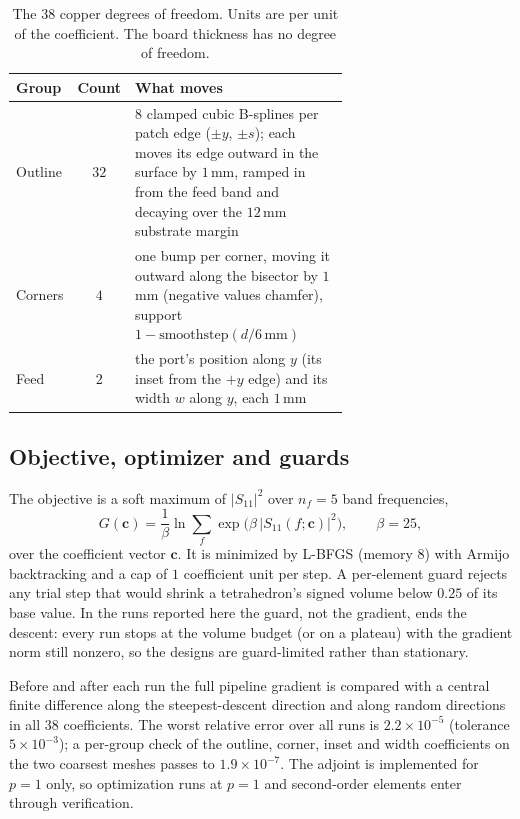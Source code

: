 \documentclass{anvil-paper}
\begin{document}
\begin{table}[t]
  \centering
  \caption{The $38$ copper degrees of freedom. Units are per unit of the
  coefficient. The board thickness has no degree of freedom.}
  \label{tab:dofs}
  \small
  \begin{tabular}{@{}l c >{\raggedright\arraybackslash}p{0.66\linewidth}@{}}
    \toprule
    Group & Count & What moves \\
    \midrule
    Outline & $32$ & $8$ clamped cubic B-splines per patch edge ($\pm y$, $\pm s$); each moves its edge outward in the surface by $1$\,mm, ramped in from the feed band and decaying over the $12$\,mm substrate margin \\
    Corners & $4$ & one bump per corner, moving it outward along the bisector by $1$\,mm (negative values chamfer), support $1 - \mathrm{smoothstep}(d/6\,\mathrm{mm})$ \\
    Feed & $2$ & the port's position along $y$ (its inset from the $+y$ edge) and its width $w$ along $y$, each $1$\,mm \\
    \bottomrule
  \end{tabular}
\end{table}

\subsection{Objective, optimizer and guards}
\label{sec:objective}

The objective is a soft maximum of $|S_{11}|^2$ over $n_f = 5$ band
frequencies,
\begin{equation}
  G(\mathbf{c}) = \frac{1}{\beta}\ln \sum_{f} \exp\!\big(\beta\,|S_{11}(f;\mathbf{c})|^2\big),
  \qquad \beta = 25,
  \label{eq:objective}
\end{equation}
over the coefficient vector $\mathbf{c}$. It is minimized by L-BFGS
(memory $8$) with Armijo backtracking and a cap of $1$ coefficient unit
per step. A per-element guard rejects any trial step that would shrink a
tetrahedron's signed volume below $0.25$ of its base value. In the runs
reported here the guard, not the gradient, ends the descent: every run
stops at the volume budget (or on a plateau) with the gradient norm still
nonzero, so the designs are guard-limited rather than stationary.

Before and after each run the full pipeline gradient is compared with a
central finite difference along the steepest-descent direction and along
random directions in all $38$ coefficients. The worst relative error over
all runs is $2.2\times10^{-5}$ (tolerance $5\times10^{-3}$); a per-group
check of the outline, corner, inset and width coefficients on the two
coarsest meshes passes to $1.9\times10^{-7}$. The adjoint is implemented
for $p = 1$ only, so optimization runs at $p = 1$ and second-order
elements enter through verification.
\end{document}
